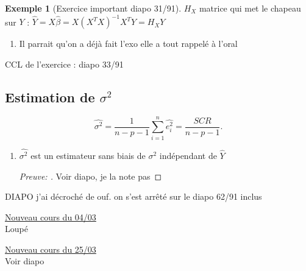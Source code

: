 \documentclass{article}
\theoremstyle{plain}%
\theoremstyle{definition}
\newtheorem{exmp}{Exemple}[section]
\theoremstyle{remark}
\begin{document}
\begin{exmp}[Exercice important diapo 31/91]
    $ H_X $ matrice qui met le chapeau sur $ Y $ : $ \hat{Y} = X \hat{\beta } = X (X^TX)^{-1} X^T Y = H_X Y $ 
    \begin{enumerate}
        \item Il parrait qu'on a déjà fait l'exo elle a tout rappelé à l'oral 
    \end{enumerate}
    CCL de l'exercice : diapo 33/91
\end{exmp}

\subsection{Estimation de $\sigma ^2$}

\[
    \hat{\sigma ^2} = \frac{1}{n-p-1}\sum_{i=1}^{n} \hat{e_i^2} = \frac{SCR}{n-p-1}
.\]
\begin{enumerate}
    \item $ \hat{\sigma ^2} $ est un estimateur sans biais de $ \sigma ^2 $ indépendant de $ \hat{Y} $ 
    \begin{proof}[Preuve: ]
        Voir diapo, je la note pas 
    \end{proof}
    
    
\end{enumerate}
DIAPO j'ai décroché de ouf. on s'est arrêté sur le diapo 62/91 inclus

\underline{Nouveau cours du 04/03} \\
Loupé

\underline{Nouveau cours du 25/03} \\
Voir diapo
\end{document}
